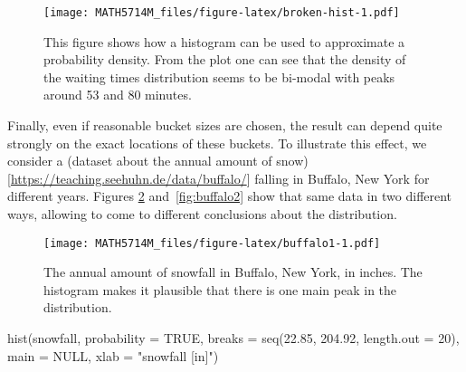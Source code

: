 \documentclass[
  a4paper,
]{article}
\newenvironment{Shaded}{\begin{snugshade}}{\end{snugshade}}
\newcommand{\AttributeTok}[1]{\textcolor[rgb]{0.77,0.63,0.00}{#1}}
\newcommand{\CommentTok}[1]{\textcolor[rgb]{0.56,0.35,0.01}{\textit{#1}}}
\newcommand{\ConstantTok}[1]{\textcolor[rgb]{0.00,0.00,0.00}{#1}}
\newcommand{\DecValTok}[1]{\textcolor[rgb]{0.00,0.00,0.81}{#1}}
\newcommand{\FloatTok}[1]{\textcolor[rgb]{0.00,0.00,0.81}{#1}}
\newcommand{\FunctionTok}[1]{\textcolor[rgb]{0.00,0.00,0.00}{#1}}
\newcommand{\NormalTok}[1]{#1}
\newcommand{\OtherTok}[1]{\textcolor[rgb]{0.56,0.35,0.01}{#1}}
\newcommand{\SpecialCharTok}[1]{\textcolor[rgb]{0.00,0.00,0.00}{#1}}
\newcommand{\StringTok}[1]{\textcolor[rgb]{0.31,0.60,0.02}{#1}}
\theoremstyle{definition}
\theoremstyle{definition}
\theoremstyle{definition}
\theoremstyle{definition}
\theoremstyle{remark}
\begin{document}
\begin{figure}
\centering
\texttt{[image: MATH5714M\_files/figure-latex/broken-hist-1.pdf]}
\caption{\label{fig:broken-hist}This figure shows how a histogram can be used to approximate a probability density. From the plot one can see that the density of the waiting times distribution seems to be bi-modal with peaks around 53 and 80 minutes.}
\end{figure}

Finally, even if reasonable bucket sizes are chosen, the result can
depend quite strongly on the exact locations of these buckets. To illustrate
this effect, we consider a
(dataset about the annual amount of snow){[}\url{https://teaching.seehuhn.de/data/buffalo/}{]}
falling in Buffalo, New York for different years. Figures \ref{fig:buffalo1}
and~\ref{fig:buffalo2} show that same data in two different ways,
allowing to come to different conclusions about the distribution.



\begin{Shaded}
\end{Shaded}

\begin{figure}
\centering
\texttt{[image: MATH5714M\_files/figure-latex/buffalo1-1.pdf]}
\caption{\label{fig:buffalo1}The annual amount of snowfall in Buffalo, New York, in inches. The histogram makes it plausible that there is one main peak in the distribution.}
\end{figure}



\begin{Shaded}
\begin{Highlighting}[]
\FunctionTok{hist}\NormalTok{(snowfall, }\AttributeTok{probability =} \ConstantTok{TRUE}\NormalTok{,}
     \AttributeTok{breaks =} \FunctionTok{seq}\NormalTok{(}\FloatTok{22.85}\NormalTok{, }\FloatTok{204.92}\NormalTok{, }\AttributeTok{length.out =} \DecValTok{20}\NormalTok{),}
     \AttributeTok{main =} \ConstantTok{NULL}\NormalTok{, }\AttributeTok{xlab =} \StringTok{"snowfall [in]"}\NormalTok{)}
\end{Highlighting}
\end{Shaded}
\end{document}
